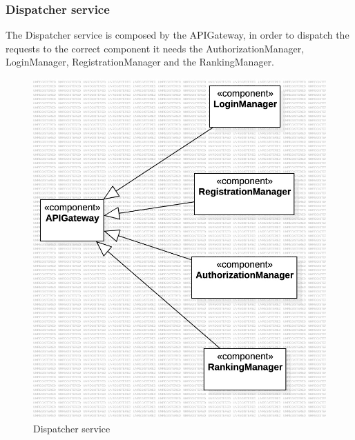 \subsubsection*{Dispatcher service}
The Dispatcher service is composed by the APIGateway, in order to dispatch the requests to the correct component it needs the AuthorizationManager, LoginManager, RegistrationManager and the RankingManager.
\begin{figure}[H]
    \centering
    \includegraphics[width=\textwidth]{Diagrams/DispatcherIntegrationPlan.jpg}
    \caption{Dispatcher service}
    \label{fig:dispatcher}
\end{figure}

